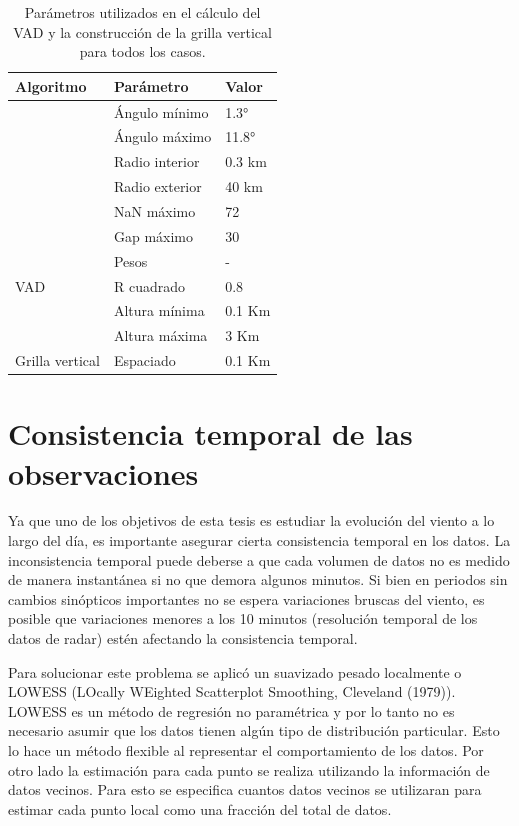 \documentclass[12pt,spanish,oneside, a4paper]{book}
\begin{document}
\begin{table}

\caption{\label{tab:parametros}Parámetros utilizados en el cálculo del VAD y la construcción de la grilla vertical para todos los casos. \label{parametros}}
\centering
\begin{tabular}[t]{lll}
\toprule
Algoritmo & Parámetro & Valor\\
\midrule
 & Ángulo mínimo & 1.3°\\
\cmidrule{2-3}
 & Ángulo máximo & 11.8°\\
\cmidrule{2-3}
 & Radio interior & 0.3 km\\
\cmidrule{2-3}
 & Radio exterior & 40 km\\
\cmidrule{2-3}
 & NaN máximo & 72\\
\cmidrule{2-3}
 & Gap máximo & 30\\
\cmidrule{2-3}
 & Pesos & -\\
\cmidrule{2-3}
\multirow{-8}{*}{\raggedright\arraybackslash VAD} & R cuadrado & 0.8\\
\cmidrule{1-3}
 & Altura mínima & 0.1 Km\\
\cmidrule{2-3}
 & Altura máxima & 3 Km\\
\cmidrule{2-3}
\multirow{-3}{*}{\raggedright\arraybackslash Grilla vertical} & Espaciado & 0.1 Km\\
\bottomrule
\end{tabular}
\end{table}

\section{Consistencia temporal de las
observaciones}\label{consistencia-temporal-de-las-observaciones}

Ya que uno de los objetivos de esta tesis es estudiar la evolución del
viento a lo largo del día, es importante asegurar cierta consistencia
temporal en los datos. La inconsistencia temporal puede deberse a que
cada volumen de datos no es medido de manera instantánea si no que
demora algunos minutos. Si bien en periodos sin cambios sinópticos
importantes no se espera variaciones bruscas del viento, es posible que
variaciones menores a los 10 minutos (resolución temporal de los datos
de radar) estén afectando la consistencia temporal.

Para solucionar este problema se aplicó un suavizado pesado localmente o
LOWESS (LOcally WEighted Scatterplot Smoothing, Cleveland (1979)).
LOWESS es un método de regresión no paramétrica y por lo tanto no es
necesario asumir que los datos tienen algún tipo de distribución
particular. Esto lo hace un método flexible al representar el
comportamiento de los datos. Por otro lado la estimación para cada punto
se realiza utilizando la información de datos vecinos. Para esto se
especifica cuantos datos vecinos se utilizaran para estimar cada punto
local como una fracción del total de datos.
\end{document}
